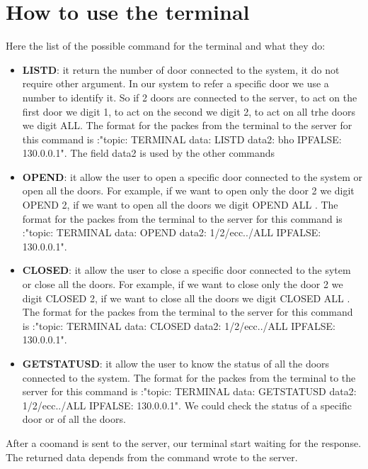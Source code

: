 \section{How to use the terminal}
Here the list of the possible command  for the terminal and what they do:
\begin{itemize}
\item \textbf{LISTD}: it return the number of door connected to the system, it do not require other argument. In our system to refer a specific door we use a number to identify it. So if 2 doors are connected to the server, to act on the first door we digit 1, to act on the second we digit 2, to act on all trhe doors we digit ALL. The format for the packes from the terminal to the server for this command is :"topic: TERMINAL data: LISTD data2: bho IPFALSE: 130.0.0.1". The field data2 is used by the other commands
\item \textbf{OPEND}: it allow the user to open a specific door connected to the system or open all the doors. For example, if we want to open only the door 2 we digit OPEND 2, if we want to open all the doors we digit OPEND ALL .  The format for the packes from the terminal to the server for this command is :"topic: TERMINAL data: OPEND data2: 1/2/ecc../ALL IPFALSE: 130.0.0.1".
\item \textbf{CLOSED}: it allow the user to close a specific door connected to the sytem or close all the doors. For example, if we want to close only the door 2 we digit CLOSED 2, if we want to close all the doors we digit CLOSED ALL .  The format for the packes from the terminal to the server for this command is :"topic: TERMINAL data: CLOSED data2: 1/2/ecc../ALL IPFALSE: 130.0.0.1".
\item \textbf{GETSTATUSD}: it allow the user to know the status of all the doors connected to the system. The format for the packes from the terminal to the server for this command is :"topic: TERMINAL data: GETSTATUSD data2: 1/2/ecc../ALL IPFALSE: 130.0.0.1". We could check the status of a specific door or of all the doors. 
\end{itemize}
After a coomand is sent to the server, our terminal start waiting for the response. The returned data depends from the command wrote to the server.
